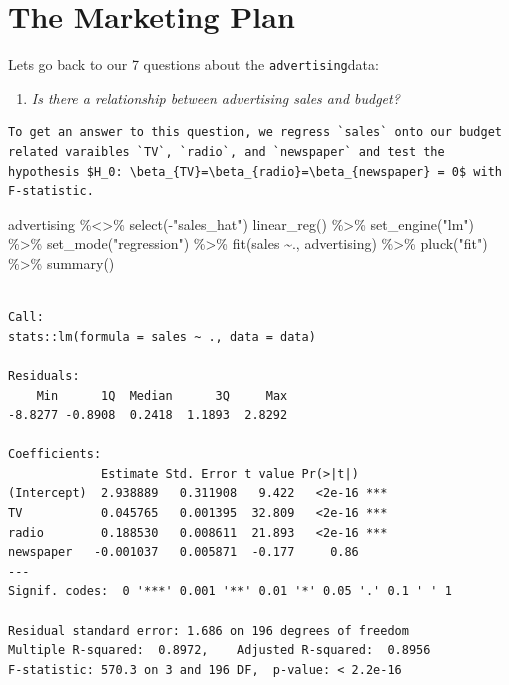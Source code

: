 \documentclass[
  letterpaper,
  DIV=11,
  numbers=noendperiod]{scrreprt}
\newenvironment{Shaded}{\begin{snugshade}}{\end{snugshade}}
\newcommand{\FunctionTok}[1]{\textcolor[rgb]{0.02,0.16,0.49}{#1}}
\newcommand{\NormalTok}[1]{\textcolor[rgb]{0.33,0.33,0.33}{#1}}
\newcommand{\SpecialCharTok}[1]{\textcolor[rgb]{0.00,0.46,0.62}{#1}}
\newcommand{\StringTok}[1]{\textcolor[rgb]{0.00,0.50,0.00}{#1}}
\providecommand{\tightlist}{%
  \setlength{\itemsep}{0pt}\setlength{\parskip}{0pt}}\usepackage{longtable,booktabs,array}
\begin{document}
\hypertarget{the-marketing-plan}{%
\section{The Marketing Plan}\label{the-marketing-plan}}

Lets go back to our 7 questions about the \texttt{advertising}data:

\begin{enumerate}
\def\labelenumi{\arabic{enumi}.}
\tightlist
\item
  \emph{Is there a relationship between advertising sales and budget?}
\end{enumerate}

\begin{verbatim}
To get an answer to this question, we regress `sales` onto our budget related varaibles `TV`, `radio`, and `newspaper` and test the hypothesis $H_0: \beta_{TV}=\beta_{radio}=\beta_{newspaper} = 0$ with F-statistic.
\end{verbatim}

\begin{Shaded}
\begin{Highlighting}[]
\NormalTok{advertising }\SpecialCharTok{\%\textless{}\textgreater{}\%} \FunctionTok{select}\NormalTok{(}\SpecialCharTok{{-}}\StringTok{"sales\_hat"}\NormalTok{)}
\FunctionTok{linear\_reg}\NormalTok{() }\SpecialCharTok{\%\textgreater{}\%} 
  \FunctionTok{set\_engine}\NormalTok{(}\StringTok{"lm"}\NormalTok{) }\SpecialCharTok{\%\textgreater{}\%} 
  \FunctionTok{set\_mode}\NormalTok{(}\StringTok{"regression"}\NormalTok{) }\SpecialCharTok{\%\textgreater{}\%} 
  \FunctionTok{fit}\NormalTok{(sales }\SpecialCharTok{\textasciitilde{}}\NormalTok{., advertising) }\SpecialCharTok{\%\textgreater{}\%} 
  \FunctionTok{pluck}\NormalTok{(}\StringTok{"fit"}\NormalTok{) }\SpecialCharTok{\%\textgreater{}\%} 
  \FunctionTok{summary}\NormalTok{()}
\end{Highlighting}
\end{Shaded}

\begin{verbatim}

Call:
stats::lm(formula = sales ~ ., data = data)

Residuals:
    Min      1Q  Median      3Q     Max 
-8.8277 -0.8908  0.2418  1.1893  2.8292 

Coefficients:
             Estimate Std. Error t value Pr(>|t|)    
(Intercept)  2.938889   0.311908   9.422   <2e-16 ***
TV           0.045765   0.001395  32.809   <2e-16 ***
radio        0.188530   0.008611  21.893   <2e-16 ***
newspaper   -0.001037   0.005871  -0.177     0.86    
---
Signif. codes:  0 '***' 0.001 '**' 0.01 '*' 0.05 '.' 0.1 ' ' 1

Residual standard error: 1.686 on 196 degrees of freedom
Multiple R-squared:  0.8972,    Adjusted R-squared:  0.8956 
F-statistic: 570.3 on 3 and 196 DF,  p-value: < 2.2e-16
\end{verbatim}
\end{document}

